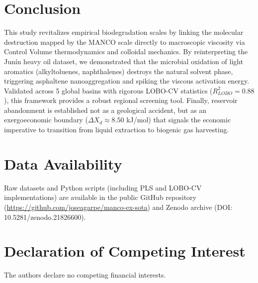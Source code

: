 \documentclass[review,12pt]{elsarticle}
\begin{document}
\section{Conclusion}
This study revitalizes empirical biodegradation scales by linking the molecular destruction mapped by the MANCO scale directly to macroscopic viscosity via Control Volume thermodynamics and colloidal mechanics. By reinterpreting the Jun\'in heavy oil dataset, we demonstrated that the microbial oxidation of light aromatics (alkyltoluenes, naphthalenes) destroys the natural solvent phase, triggering asphaltene nanoaggregation and spiking the viscous activation energy. Validated across 5 global basins with rigorous LOBO-CV statistics ($R^2_{LOBO} = 0.88$), this framework provides a robust regional screening tool. Finally, reservoir abandonment is established not as a geological accident, but as an exergoeconomic boundary ($\Delta X_d \approx 8.50$ kJ/mol) that signals the economic imperative to transition from liquid extraction to biogenic gas harvesting.

\section*{Data Availability}
Raw datasets and Python scripts (including PLS and LOBO-CV implementations) are available in the public GitHub repository (\url{https://github.com/joseagarpe/manco-ex-sota}) and Zenodo archive (DOI: 10.5281/zenodo.21826600).

\section*{Declaration of Competing Interest}
The authors declare no competing financial interests.
\end{document}
